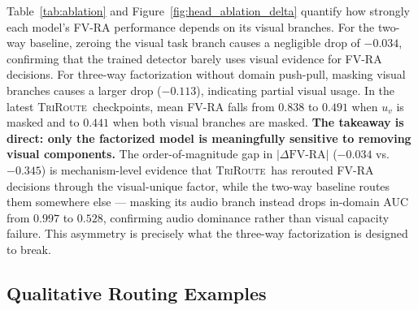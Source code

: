 \documentclass{article}
\newcommand{\method}{\textsc{TriRoute}}
\begin{document}
Table~\ref{tab:ablation} and Figure~\ref{fig:head_ablation_delta} quantify how strongly each model's FV-RA performance depends on its visual branches. For the two-way baseline, zeroing the visual task branch causes a negligible drop of $-0.034$, confirming that the trained detector barely uses visual evidence for FV-RA decisions. For three-way factorization without domain push-pull, masking visual branches causes a larger drop ($-0.113$), indicating partial visual usage. In the latest \method\ checkpoints, mean FV-RA falls from $0.838$ to $0.491$ when $u_v$ is masked and to $0.441$ when both visual branches are masked. \textbf{The takeaway is direct: only the factorized model is meaningfully sensitive to removing visual components.} The order-of-magnitude gap in $|\Delta\text{FV-RA}|$ ($-0.034$ vs.\ $-0.345$) is mechanism-level evidence that \method\ has rerouted FV-RA decisions through the visual-unique factor, while the two-way baseline routes them somewhere else --- masking its audio branch instead drops in-domain AUC from $0.997$ to $0.528$, confirming audio dominance rather than visual capacity failure. This asymmetry is precisely what the three-way factorization is designed to break.

\subsection{Qualitative Routing Examples}
\label{sec:qualitative}

\end{document}
